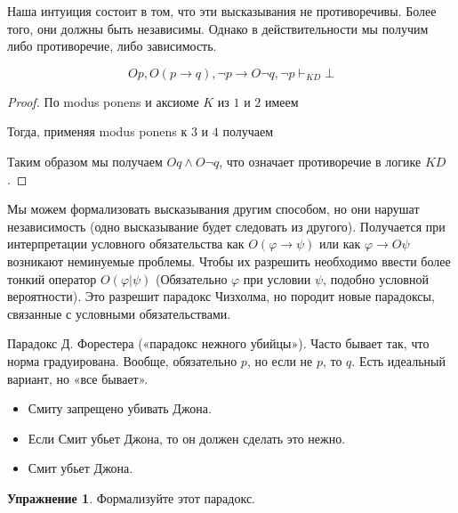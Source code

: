 \documentclass[openany]{book}
\theoremstyle{plain}
\theoremstyle{definition}
\newtheorem{xrc}{Упражнение}[]
\begin{document}
Наша интуиция состоит в том, что эти высказывания не противоречивы. Более того, они должны быть независимы. Однако в действительности мы получим либо противоречие, либо зависимость. 

\[O p, O (p \to q), \neg p \to O \neg q, \neg p \vdash_{K D} \bot\]

\begin{proof}
По modus ponens и аксиоме \(K\) из \(1\) и \(2\) имеем

\begin{prooftree}
\end{prooftree}

Тогда, применяя modus ponens к \(3\) и \(4\) получаем

\begin{prooftree}
\end{prooftree}

Таким образом мы получаем \(O q \land O \neg q\), что означает противоречие в логике \(K D\).

\end{proof}

Мы можем формализовать высказывания другим способом, но они нарушат независимость (одно высказывание будет следовать из другого). Получается при интерпретации условного обязательства как \(O (\varphi \to \psi)\) или как \(\varphi \to O \psi\) возникают неминуемые проблемы. Чтобы их разрешить необходимо ввести более тонкий оператор \(O(\varphi | \psi)\) (Обязательно \(\varphi\) при условии \(\psi\), подобно условной вероятности). Это разрешит парадокс Чизхолма, но породит новые парадоксы, связанные с условными обязательствами. 


Парадокс Д. Форестера («парадокс нежного убийцы»). Часто бывает так, что норма градуирована. Вообще, обязательно \(p\), но если не \(p\), то \(q\). Есть идеальный вариант, но «все бывает».

\begin{itemize}
\item{Смиту запрещено убивать Джона.}
\item{Если Смит убьет Джона, то он должен сделать это нежно.}
\item{Смит убьет Джона.}
\end{itemize}

\begin{xrc}
Формализуйте этот парадокс.
\end{xrc}
\end{document}
